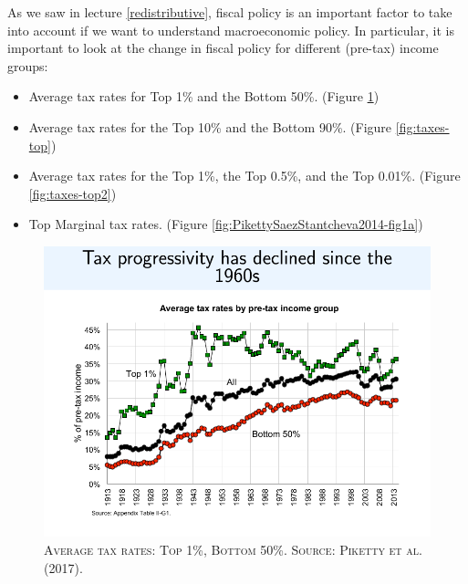\documentclass[]{book}
\providecommand{\tightlist}{%
  \setlength{\itemsep}{0pt}\setlength{\parskip}{0pt}}
\begin{document}
As we saw in lecture \ref{redistributive}, fiscal policy is an important
factor to take into account if we want to understand macroeconomic
policy. In particular, it is important to look at the change in fiscal
policy for different (pre-tax) income groups:

\begin{itemize}
\tightlist
\item
  Average tax rates for Top 1\% and the Bottom 50\%. (Figure
  \ref{fig:PikettySaezZucman2017-fig10a})
\item
  Average tax rates for the Top 10\% and the Bottom 90\%. (Figure
  \ref{fig:taxes-top})
\item
  Average tax rates for the Top 1\%, the Top 0.5\%, and the Top 0.01\%.
  (Figure \ref{fig:taxes-top2})
\item
  Top Marginal tax rates. (Figure
  \ref{fig:PikettySaezStantcheva2014-fig1a})
\end{itemize}




\begin{figure}

{\centering \includegraphics[width=0.8\linewidth,height=0.8\textheight]{figures/PikettySaezZucman2017/fig10a} 

}

\caption{\textsc{Average tax rates: Top 1\%,
Bottom 50\%. Source: Piketty et al. (2017).}}\label{fig:PikettySaezZucman2017-fig10a}
\end{figure}
\end{document}

